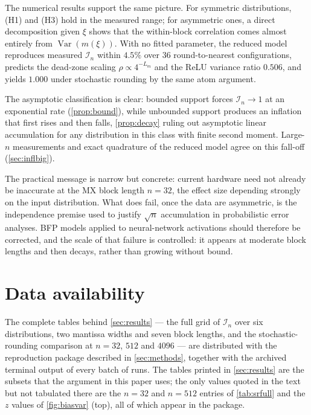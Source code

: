 \documentclass[twocolumn,review,hidelinks,oneeqnum,onetabnum,onefignum,onethmnum]{siamart251216}
\begin{document}
The numerical results support the same picture. For symmetric distributions, (H1)
and (H3) hold in the measured range; for asymmetric ones, a direct decomposition
given $\xi$ shows that the within-block correlation comes almost entirely from
$\operatorname{Var}(m(\xi))$. With no fitted parameter, the reduced model
reproduces measured $\mathcal I_n$ within $4.5\%$ over $36$ round-to-nearest
configurations, predicts the dead-zone scaling $\rho\propto4^{-L_m}$ and the ReLU
variance ratio $0.506$, and yields $1.000$ under stochastic rounding by the same
atom argument.

The asymptotic classification is clear: bounded support forces $\mathcal I_n\to1$
at an exponential rate (\cref{prop:bound}), while unbounded support produces an
inflation that first rises and then falls, \cref{prop:decay} ruling out asymptotic
linear accumulation for any distribution in this class with finite second moment.
Large-$n$ measurements and exact quadrature of the reduced model agree on this
fall-off (\cref{sec:inflbig}).

The practical message is narrow but concrete: current hardware need not already be
inaccurate at the MX block length $n=32$, the effect size depending strongly on
the input distribution. What does fail, once the data are asymmetric, is the
independence premise used to justify $\sqrt n$ accumulation in probabilistic
error analyses. BFP models applied to neural-network activations should therefore
be corrected, and the scale of that failure is controlled: it appears at
moderate block lengths and then decays, rather than growing without bound.

\clearpage
\appendix

\section{Data availability}
\label{app:full}

The complete tables behind \cref{sec:results} — the full grid of
$\mathcal I_n$ over six distributions, two mantissa widths and seven block
lengths, and the stochastic-rounding comparison at $n=32$, $512$ and $4096$ —
are distributed with the reproduction package described in
\cref{sec:methods}, together with the archived terminal output of every batch of
runs. The tables printed in \cref{sec:results} are the subsets that the
argument in this paper uses; the only values quoted in the text but not tabulated
there are the $n=32$ and $n=512$ entries of \cref{tab:srfull} and the
$z$ values of \cref{fig:biasvar} (top), all of which appear in the package.
\end{document}
